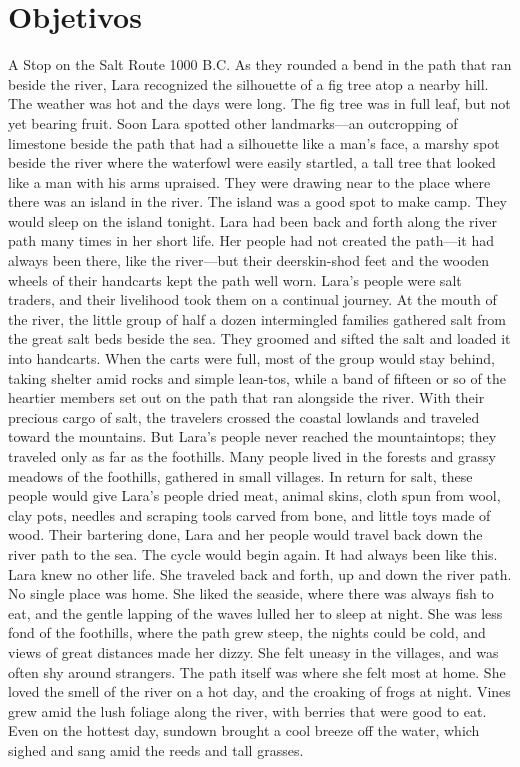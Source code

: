 \chapter{\label{ch:2-litreview}Objetivos}
A Stop on the Salt Route
1000 B.C.
As they rounded a bend in the path that ran beside the river, Lara recognized the silhouette of a fig tree atop a nearby hill. The weather was hot and the days were long. The fig tree was in full leaf, but not yet bearing fruit.
Soon Lara spotted other landmarks—an outcropping of limestone beside the path that had a silhouette like a man’s face, a marshy spot beside the river where the waterfowl were easily startled, a tall tree that looked like a man with his arms upraised. They were drawing near to the place where there was an island in the river. The island was a good spot to make camp. They would sleep on the island tonight.
Lara had been back and forth along the river path many times in her short life. Her people had not created the path—it had always been there, like the river—but their deerskin-shod feet and the wooden wheels of their handcarts kept the path well worn. Lara’s people were salt traders, and their livelihood took them on a continual journey.
At the mouth of the river, the little group of half a dozen intermingled families gathered salt from the great salt beds beside the sea. They groomed and sifted the salt and loaded it into handcarts. When the carts were full, most of the group would stay behind, taking shelter amid rocks and simple lean-tos, while a band of fifteen or so of the heartier members set out on the path that ran alongside the river.
With their precious cargo of salt, the travelers crossed the coastal lowlands and traveled toward the mountains. But Lara’s people never reached the mountaintops; they traveled only as far as the foothills. Many people lived in the forests and grassy meadows of the foothills, gathered in small villages. In return for salt, these people would give Lara’s people dried meat, animal skins, cloth spun from wool, clay pots, needles and scraping tools carved from bone, and little toys made of wood.
Their bartering done, Lara and her people would travel back down the river path to the sea. The cycle would begin again.
It had always been like this. Lara knew no other life. She traveled back and forth, up and down the river path. No single place was home. She liked the seaside, where there was always fish to eat, and the gentle lapping of the waves lulled her to sleep at night. She was less fond of the foothills, where the path grew steep, the nights could be cold, and views of great distances made her dizzy. She felt uneasy in the villages, and was often shy around strangers. The path itself was where she felt most at home. She loved the smell of the river on a hot day, and the croaking of frogs at night. Vines grew amid the lush foliage along the river, with berries that were good to eat. Even on the hottest day, sundown brought a cool breeze off the water, which sighed and sang amid the reeds and tall grasses.
